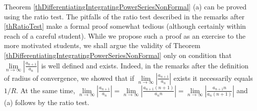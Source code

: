 \documentclass[12pt]{book}
\begin{document}
Theorem \ref{thDifferentiatingIntegratingPowerSeriesNonFormal} (a) can be proved using the ratio test. The pitfalls of the ratio test described in the remarks after \ref{thRatioTest} make a formal proof somewhat tedious (although certainly within reach of a careful student). While we propose such a proof as an exercise to the more motivated students, we shall argue the validity of  Theorem \ref{thDifferentiatingIntegratingPowerSeriesNonFormal} only on condition that $\lim\limits_{n\to\infty} \left|\frac{a_{n+1}}{a_n}\right|$ is well defined and exists. Indeed, in the remarks after the definition of radius of convergence, we showed that if $\lim\limits_{n\to\infty} \left|\frac{a_{n+1}}{a_n}\right|$ exists it necessarily equals $1/R$. At the same time, $\lim\limits_{n\to\infty} \left|\frac{a_{n+1}}{a_n}\right| = \lim\limits_{n\to\infty} \left|\frac{a_{n+1}(n+1)}{a_n n}\right|= \lim\limits_{n\to\infty} \left|\frac{a_{n+1}n}{a_n (n+1)}\right|$ and (a) follows by the ratio test. 
\end{document}
